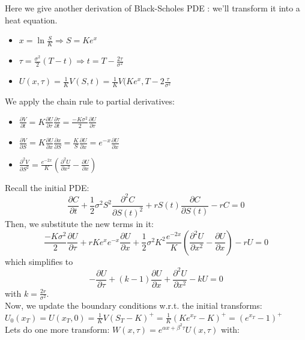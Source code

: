 \documentclass[a4paper]{report}
\begin{document}
\begin{itemize}
Here we give another derivation of Black-Scholes PDE : we'll transform it into a heat equation.\\
\begin{itemize}
\item $x=\ln \frac{S}{K} \Rightarrow S=Ke^x$
\item $\tau = \frac{\sigma^2}{2}(T-t) \Rightarrow t=T-\frac{2\tau}{\sigma^2}$
\item $U(x,\tau)=\frac{1}{K} V(S,t)=\frac{1}{K} V(Ke^x, T-2\frac{\tau}{\sigma^2}$
\end{itemize}
We apply the chain rule to partial derivatives:
\begin{itemize}
\item $\frac{\partial V}{\partial t}=K \frac{\partial U}{\partial \tau}\frac{\partial \tau}{\partial t} =\frac{-K\sigma^2}{2} \frac{\partial U}{\partial \tau} $
\item $\frac{\partial V}{\partial S}=K \frac{\partial U}{\partial x}\frac{\partial x}{\partial S} =\frac{K}{S} \frac{\partial U}{\partial x}=e^{-x} \frac{\partial U}{\partial x} $
\item  $\frac{\partial^2 V}{\partial S^2} = \frac{e^{-2x}}{K}(\frac{\partial^2 U}{\partial x^2}-\frac{\partial U}{\partial x})$
\end{itemize}
Recall the initial PDE:
\begin{equation}
\frac{\partial C}{\partial t}+\frac{1}{2} \sigma^2 S^2\frac{\partial^2 C}{\partial S(t)^2} + rS(t)\frac{\partial C}{\partial S(t)} - rC=0
\end{equation}
Then, we substitute the new terms in it:
\begin{equation}
\frac{-K\sigma^2}{2} \frac{\partial U}{\partial \tau}+rKe^xe^{-x} \frac{\partial U}{\partial x}+\frac{1}{2}\sigma^2K^2\frac{e^{-2x}}{K}(\frac{\partial^2 U}{\partial x^2}-\frac{\partial U}{\partial x})-rU=0
\end{equation}
which simplifies to
\begin{equation}
-\frac{\partial U}{\partial \tau} + (k-1)\frac{\partial U}{\partial x}+\frac{\partial^2 U}{\partial x^2}-kU=0
\end{equation}
with $k=\frac{2r}{\sigma^2}$.\\
Now, we update the boundary conditions w.r.t. the initial transforms:
$U_0(x_T)=U(x_T,0)=\frac{1}{K}V(S_T-K)^+=\frac{1}{K}(Ke^{x_T}-K)^+=(e^{x_T}-1)^+$\\
Lets do one more transform:
$W(x,\tau) = e^{\alpha x+\beta^2 \tau}U(x,\tau)$ with:
\begin{itemize}

\end{itemize}
\end{itemize}
\end{document}
